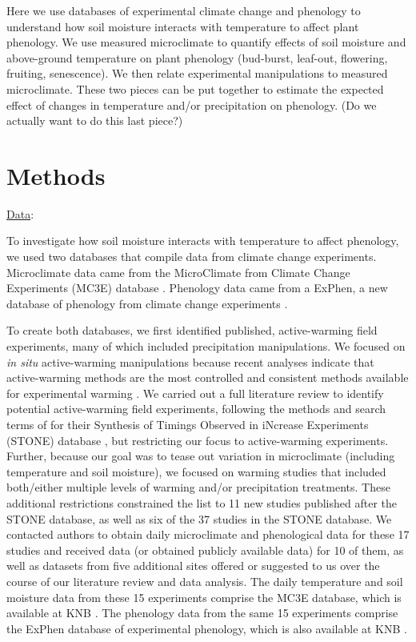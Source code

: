 \documentclass{article}
\begin{document}
\begin{singlespace}
Here we use databases of experimental climate change and phenology to understand how soil moisture interacts with temperature to affect plant phenology. We use measured microclimate to quantify effects of soil moisture and above-ground temperature on plant phenology (bud-burst, leaf-out, flowering, fruiting, senescence). We then relate experimental manipulations to measured microclimate. These two pieces can be put together to estimate the expected effect of changes in temperature and/or precipitation on phenology. (Do we actually want to do this last piece?) 
\end{singlespace}

\section* {Methods}
\begin{singlespace}
\underline{Data}: 
\par To investigate how soil moisture interacts with temperature to affect phenology, we used two databases that compile data from climate change experiments. Microclimate data came from the  MicroClimate from Climate Change Experiments (MC3E) database \cite{ettinger2018}. Phenology data came from a ExPhen, a new database of phenology from climate change experiments \cite{ettinger2018b}. 
\par To create both databases, we first identified published, active-warming field experiments, many of which included precipitation manipulations. We focused on \textit{in situ} active-warming manipulations because recent analyses indicate that active-warming methods are the most controlled and consistent methods available for experimental warming \citep{kimball2005,kimball2008,aronson2009,wolkovich2012}. We carried out a full literature review to identify potential active-warming field experiments, following the methods and search terms of \citet{wolkovich2012} for their Synthesis of Timings Observed in iNcrease Experiments (STONE) database \citep{wolkovich2012}, but restricting our focus to active-warming experiments. Further, because our goal was to tease out variation in microclimate (including temperature and soil moisture), we focused on warming studies that included both/either multiple levels of warming and/or precipitation treatments. These additional restrictions constrained the list to 11 new studies published after the STONE database, as well as six of the 37 studies in the STONE database. We contacted authors to obtain daily microclimate and phenological data for these 17 studies and received data (or obtained publicly available data) for 10 of them, as well as datasets from five additional sites offered or suggested to us over the course of our literature review and data analysis. The daily temperature and soil moisture data from these 15 experiments comprise the MC3E database, which is available at KNB \citep{ettinger2018}. The phenology data from the same 15 experiments comprise the ExPhen database of experimental phenology, which is also available at KNB \citep{ettinger2018b}.


\end{singlespace}
\end{document}
